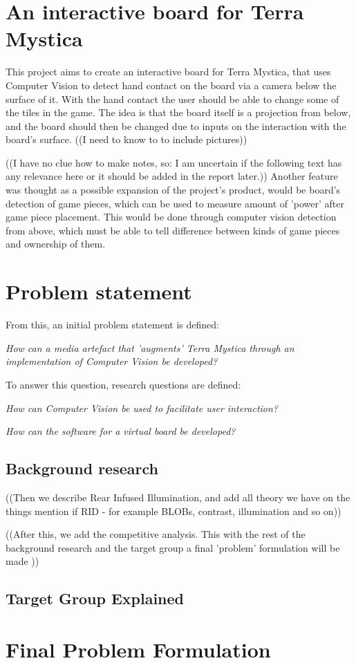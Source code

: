 \section{An interactive board for Terra Mystica}
This project aims to create an interactive board for Terra Mystica, that uses Computer Vision to detect hand contact on the board via a camera below the surface of it. With the hand contact the user should be able to change some of the tiles in the game. The idea is that the board itself is a projection from below, and the board should then be changed due to inputs on the interaction with the board's surface. ((I need to know to to include pictures))

((I have no clue how to make notes, so: I am uncertain if the following text has any relevance here or it should be added in the report later.))
Another feature was thought as a possible expansion of the project's product, would be board's detection of game pieces, which can be used to measure amount of 'power' after game piece placement. This would be done through computer vision detection from above, which must be able to tell difference between kinds of game pieces and ownership of them.

\section{Problem statement}
From this, an initial problem statement is defined: 

\textit{How can a media artefact that 'augments' Terra Mystica through an implementation of Computer Vision be developed?}

To answer this question, research questions are defined:

\textit{How can Computer Vision be used to facilitate user interaction?}

\textit{How can the software for a virtual board be developed?}

\subsection{Background research}
((Then we describe Rear Infused Illumination, and add all theory we have on the things mention if RID - for example BLOBs, contrast, illumination and so on))

((After this, we add the competitive analysis. This with the rest of the background research and the target group a final 'problem' formulation will be made ))



\subsection{Target Group Explained}

\section{Final Problem Formulation}\label{sec:finalprob}


